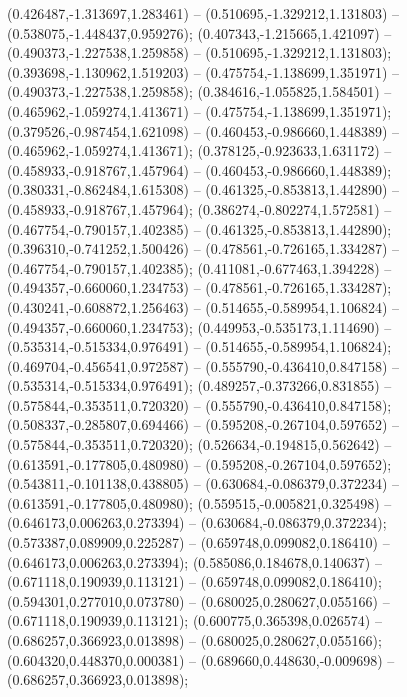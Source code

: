  (0.426487,-1.313697,1.283461) -- (0.510695,-1.329212,1.131803) -- (0.538075,-1.448437,0.959276);
 (0.407343,-1.215665,1.421097) -- (0.490373,-1.227538,1.259858) -- (0.510695,-1.329212,1.131803);
 (0.393698,-1.130962,1.519203) -- (0.475754,-1.138699,1.351971) -- (0.490373,-1.227538,1.259858);
 (0.384616,-1.055825,1.584501) -- (0.465962,-1.059274,1.413671) -- (0.475754,-1.138699,1.351971);
 (0.379526,-0.987454,1.621098) -- (0.460453,-0.986660,1.448389) -- (0.465962,-1.059274,1.413671);
 (0.378125,-0.923633,1.631172) -- (0.458933,-0.918767,1.457964) -- (0.460453,-0.986660,1.448389);
 (0.380331,-0.862484,1.615308) -- (0.461325,-0.853813,1.442890) -- (0.458933,-0.918767,1.457964);
 (0.386274,-0.802274,1.572581) -- (0.467754,-0.790157,1.402385) -- (0.461325,-0.853813,1.442890);
 (0.396310,-0.741252,1.500426) -- (0.478561,-0.726165,1.334287) -- (0.467754,-0.790157,1.402385);
 (0.411081,-0.677463,1.394228) -- (0.494357,-0.660060,1.234753) -- (0.478561,-0.726165,1.334287);
 (0.430241,-0.608872,1.256463) -- (0.514655,-0.589954,1.106824) -- (0.494357,-0.660060,1.234753);
 (0.449953,-0.535173,1.114690) -- (0.535314,-0.515334,0.976491) -- (0.514655,-0.589954,1.106824);
 (0.469704,-0.456541,0.972587) -- (0.555790,-0.436410,0.847158) -- (0.535314,-0.515334,0.976491);
 (0.489257,-0.373266,0.831855) -- (0.575844,-0.353511,0.720320) -- (0.555790,-0.436410,0.847158);
 (0.508337,-0.285807,0.694466) -- (0.595208,-0.267104,0.597652) -- (0.575844,-0.353511,0.720320);
 (0.526634,-0.194815,0.562642) -- (0.613591,-0.177805,0.480980) -- (0.595208,-0.267104,0.597652);
 (0.543811,-0.101138,0.438805) -- (0.630684,-0.086379,0.372234) -- (0.613591,-0.177805,0.480980);
 (0.559515,-0.005821,0.325498) -- (0.646173,0.006263,0.273394) -- (0.630684,-0.086379,0.372234);
 (0.573387,0.089909,0.225287) -- (0.659748,0.099082,0.186410) -- (0.646173,0.006263,0.273394);
 (0.585086,0.184678,0.140637) -- (0.671118,0.190939,0.113121) -- (0.659748,0.099082,0.186410);
 (0.594301,0.277010,0.073780) -- (0.680025,0.280627,0.055166) -- (0.671118,0.190939,0.113121);
 (0.600775,0.365398,0.026574) -- (0.686257,0.366923,0.013898) -- (0.680025,0.280627,0.055166);
 (0.604320,0.448370,0.000381) -- (0.689660,0.448630,-0.009698) -- (0.686257,0.366923,0.013898);
